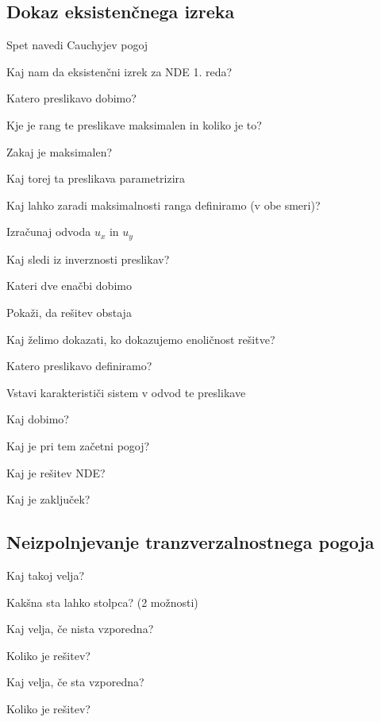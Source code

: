 \documentclass{article}
\begin{document}
    \subsection{Dokaz eksistenčnega izreka}
    \begin{enumerate}
        {\color{red}\item Spet navedi Cauchyjev pogoj}
        {\color{red}\item Kaj nam da eksistenčni izrek za NDE 1. reda?}
        \item Katero preslikavo dobimo?
        {\color{red}\item Kje je rang te preslikave maksimalen in koliko je to?}
        \item Zakaj je maksimalen?
        \item Kaj torej ta preslikava parametrizira
        \item Kaj lahko zaradi maksimalnosti ranga definiramo (v obe smeri)?
        \item Izračunaj odvoda $u_x$ in $u_y$
        {\color{red}\item Kaj sledi iz inverznosti preslikav?}
        \item Kateri dve enačbi dobimo
        \item Pokaži, da rešitev obstaja
        {\color{red}\item Kaj želimo dokazati, ko dokazujemo enoličnost rešitve?}
        \item Katero preslikavo definiramo?
        \item Vstavi karakterističi sistem v odvod te preslikave
        \item Kaj dobimo?
        \item Kaj je pri tem začetni pogoj?
        \item Kaj je rešitev NDE?
        \item Kaj je zaključek?
    \end{enumerate}

    \subsection{Neizpolnjevanje tranzverzalnostnega pogoja}
    \begin{enumerate}
        \item Kaj takoj velja?
        \item Kakšna sta lahko stolpca? (2 možnosti)
        {\color{red}\item Kaj velja, če nista vzporedna?}
        {\color{red}\item Koliko je rešitev?}
        {\color{red}\item Kaj velja, če sta vzporedna?}
        {\color{red}\item Koliko je rešitev?}
    \end{enumerate}
\end{document}
